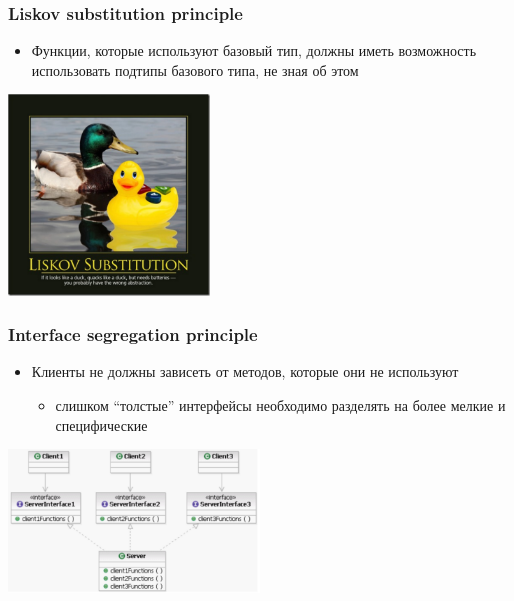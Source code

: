 \documentclass[xetex,mathserif,serif]{beamer}
\begin{document}
	\begin{frame}
		\frametitle{Liskov substitution principle}
		\begin{itemize}
			\item Функции, которые используют базовый тип, должны иметь возможность использовать подтипы базового типа, не зная об этом
		\end{itemize}
		\begin{flushright}
			\includegraphics[width=0.4\textwidth]{liskovSubstitutionPrinciple.png}
		\end{flushright}
	\end{frame}

	\begin{frame}
		\frametitle{Interface segregation principle}
		\begin{itemize}
			\item Клиенты не должны зависеть от методов, которые они не используют
			\begin{itemize}
				\item слишком ``толстые'' интерфейсы необходимо разделять на более мелкие и специфические
			\end{itemize}
		\end{itemize}
		\begin{flushright}
			\includegraphics[width=0.5\textwidth]{interfaceSegregationPrinciple.png}
		\end{flushright}
	\end{frame}
\end{document}
